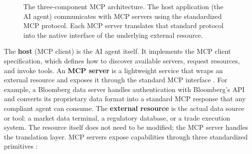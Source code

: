 \documentclass{article}
\begin{document}
\begin{figure}[h!]
\centering
{}

\caption{The three-component MCP architecture. The host application (the AI agent) communicates with MCP servers using the standardized MCP protocol. Each MCP server translates that standard protocol into the native interface of the underlying external resource.}
\label{fig:mcp-architecture}
\end{figure}

The \textbf{host} (MCP client) is the AI agent itself. It implements the MCP client specification, which defines how to discover available servers, request resources, and invoke tools. An \textbf{MCP server} is a lightweight service that wraps an external resource and exposes it through the standard MCP interface \cite{mcpspec2025}. For example, a Bloomberg data server handles authentication with Bloomberg's API and converts its proprietary data format into a standard MCP response that any compliant agent can consume. The \textbf{external resource} is the actual data source or tool: a market data terminal, a regulatory database, or a trade execution system. The resource itself does not need to be modified; the MCP server handles the translation layer. MCP servers expose capabilities through three standardized primitives \cite{mcpspec2025}:
\end{document}
